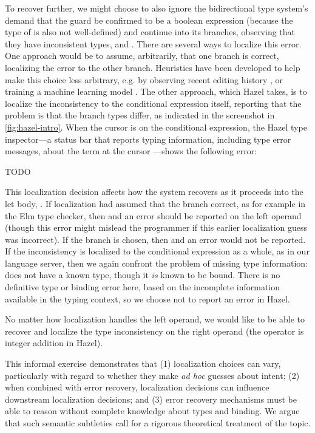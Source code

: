 To recover further, we might choose to also ignore the bidirectional type system's demand that the guard be confirmed to be a boolean expression 
(because the type of  is also not well-defined) 
and continue into its branches, observing that they have inconsistent types,  and . 
There are several ways to localize this error. 
One approach would be to assume, arbitrarily, that one branch is correct, localizing the error to the other branch. 
Heuristics have been developed to help make this choice less arbitrary, e.g. 
by observing recent editing history , 
or training a machine learning model . 
The other approach, which Hazel takes, is to localize the inconsistency to the conditional expression itself, reporting that the problem is that the branch types differ, as indicated in
the screenshot in \autoref{fig:hazel-intro}. When the cursor is on the conditional expression, the Hazel type inspector---a status bar that reports typing information, including type error messages, about the term at the cursor \cite{hannah1}---shows the following error:

TODO

This localization decision affects how the system recovers as it proceeds into the let body, . 
If localization had assumed that the  branch correct, as for example in the Elm type checker, then  and an error should be reported on the left operand (though this error might mislead the programmer if this earlier localization guess was incorrect).
If the  branch is chosen, then  and an error would not be reported. 
If the inconsistency is localized to the conditional expression as a whole, as in our language server, then we again confront the problem of missing type information: 
 does not have a known type,
though it \emph{is} known to be bound. 
There is no definitive type or binding error here, based on the incomplete information available in the typing context, 
so we choose not to report an error in Hazel.

No matter how localization handles the left operand, we would like to be able to recover and 
localize the type inconsistency on the right operand (the \li{+} operator is integer addition in Hazel).

This informal exercise demonstrates that (1) localization choices can vary, particularly with regard to whether they make \emph{ad hoc} guesses about intent;  
(2) when combined with error recovery, localization decisions can influence downstream localization decisions; and 
(3) error recovery mechanisms must be able to reason without complete knowledge about types and binding. We argue that such semantic subtleties call for a rigorous theoretical treatment of the topic.

